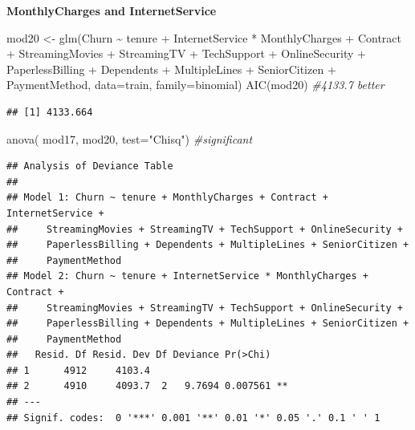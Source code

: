 \documentclass[
  twoside]{article}
\newenvironment{Shaded}{\begin{snugshade}}{\end{snugshade}}
\newcommand{\AttributeTok}[1]{\textcolor[rgb]{0.77,0.63,0.00}{#1}}
\newcommand{\CommentTok}[1]{\textcolor[rgb]{0.56,0.35,0.01}{\textit{#1}}}
\newcommand{\FunctionTok}[1]{\textcolor[rgb]{0.00,0.00,0.00}{#1}}
\newcommand{\NormalTok}[1]{#1}
\newcommand{\OtherTok}[1]{\textcolor[rgb]{0.56,0.35,0.01}{#1}}
\newcommand{\SpecialCharTok}[1]{\textcolor[rgb]{0.00,0.00,0.00}{#1}}
\newcommand{\StringTok}[1]{\textcolor[rgb]{0.31,0.60,0.02}{#1}}
\begin{document}
\textbf{MonthlyCharges and InternetService}

\begin{Shaded}
\begin{Highlighting}[]
\NormalTok{mod20 }\OtherTok{\textless{}{-}} \FunctionTok{glm}\NormalTok{(Churn }\SpecialCharTok{\textasciitilde{}}\NormalTok{ tenure }\SpecialCharTok{+}\NormalTok{ InternetService }\SpecialCharTok{*}\NormalTok{ MonthlyCharges }\SpecialCharTok{+}\NormalTok{ Contract }\SpecialCharTok{+} 
\NormalTok{               StreamingMovies }\SpecialCharTok{+}\NormalTok{ StreamingTV }\SpecialCharTok{+}\NormalTok{ TechSupport }\SpecialCharTok{+}\NormalTok{ OnlineSecurity }\SpecialCharTok{+} 
\NormalTok{               PaperlessBilling }\SpecialCharTok{+}\NormalTok{ Dependents }\SpecialCharTok{+}\NormalTok{ MultipleLines }\SpecialCharTok{+}\NormalTok{ SeniorCitizen }\SpecialCharTok{+} 
\NormalTok{               PaymentMethod, }\AttributeTok{data=}\NormalTok{train, }\AttributeTok{family=}\NormalTok{binomial)}
\FunctionTok{AIC}\NormalTok{(mod20) }\CommentTok{\#4133.7 better}
\end{Highlighting}
\end{Shaded}

\begin{verbatim}
## [1] 4133.664
\end{verbatim}

\begin{Shaded}
\begin{Highlighting}[]
\FunctionTok{anova}\NormalTok{( mod17, mod20,  }\AttributeTok{test=}\StringTok{"Chisq"}\NormalTok{) }\CommentTok{\#significant}
\end{Highlighting}
\end{Shaded}

\begin{verbatim}
## Analysis of Deviance Table
## 
## Model 1: Churn ~ tenure + MonthlyCharges + Contract + InternetService + 
##     StreamingMovies + StreamingTV + TechSupport + OnlineSecurity + 
##     PaperlessBilling + Dependents + MultipleLines + SeniorCitizen + 
##     PaymentMethod
## Model 2: Churn ~ tenure + InternetService * MonthlyCharges + Contract + 
##     StreamingMovies + StreamingTV + TechSupport + OnlineSecurity + 
##     PaperlessBilling + Dependents + MultipleLines + SeniorCitizen + 
##     PaymentMethod
##   Resid. Df Resid. Dev Df Deviance Pr(>Chi)   
## 1      4912     4103.4                        
## 2      4910     4093.7  2   9.7694 0.007561 **
## ---
## Signif. codes:  0 '***' 0.001 '**' 0.01 '*' 0.05 '.' 0.1 ' ' 1
\end{verbatim}
\end{document}
